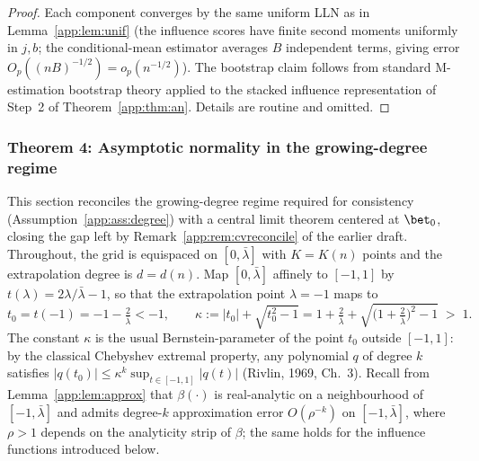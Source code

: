 \begin{proof}
Each component converges by the same uniform LLN as in
Lemma~\ref{app:lem:unif} (the influence scores have finite second moments
uniformly in $j,b$; the conditional-mean estimator averages $B$
independent terms, giving error $O_p((nB)^{-1/2})=o_p(n^{-1/2})$). The
bootstrap claim follows from standard M-estimation bootstrap theory
applied to the stacked influence representation of Step~2 of
Theorem~\ref{app:thm:an}. Details are routine and omitted.
\end{proof}

\subsubsection{Theorem 4: Asymptotic normality in the growing-degree regime}
\label{app:sec:growing}

This section reconciles the growing-degree regime required for
consistency (Assumption~\ref{app:ass:degree}) with a central limit theorem
centered at $\bet_0$, closing the gap left by Remark~\ref{app:rem:cvreconcile}
of the earlier draft. Throughout, the grid is equispaced on
$[0,\bar\lambda]$ with $K=K(n)$ points and the extrapolation degree is
$d=d(n)$. Map $[0,\bar\lambda]$ affinely to $[-1,1]$ by
$t(\lambda)=2\lambda/\bar\lambda-1$, so that the extrapolation point
$\lambda=-1$ maps to
\[
  t_0=t(-1)=-1-\tfrac{2}{\bar\lambda}<-1,
  \qquad
  \kappa:=|t_0|+\sqrt{t_0^2-1}
  =1+\tfrac{2}{\bar\lambda}
   +\sqrt{\bigl(1+\tfrac{2}{\bar\lambda}\bigr)^2-1}\;>\;1 .
\]
The constant $\kappa$ is the usual Bernstein-parameter of the point $t_0$
outside $[-1,1]$: by the classical Chebyshev extremal property, any
polynomial $q$ of degree $k$ satisfies
$|q(t_0)|\le\kappa^{k}\sup_{t\in[-1,1]}|q(t)|$
(Rivlin, 1969, Ch.~3). Recall from Lemma~\ref{app:lem:approx} that
$\beta(\cdot)$ is real-analytic on a neighbourhood of $[-1,\bar\lambda]$
and admits degree-$k$ approximation error $O(\rho^{-k})$ on
$[-1,\bar\lambda]$, where $\rho>1$ depends on the analyticity strip of
$\beta$; the same holds for the influence functions introduced below.

